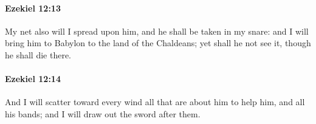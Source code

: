 		\paragraph{Ezekiel 12:13} %
			\label{EZEKIEL-12-13}

			My net also will I spread upon him, and he shall be taken in my snare: and I will bring him to Babylon to the land of the Chaldeans; yet shall he not see it, though he shall die there.


		\paragraph{Ezekiel 12:14} %
			\label{EZEKIEL-12-14}

			And I will scatter toward every wind all that are about him to help him, and all his bands; and I will draw out the sword after them.


